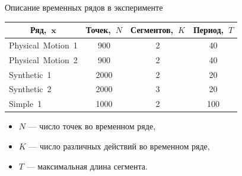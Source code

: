 \documentclass[10pt,pdf,hyperref={unicode}]{beamer}
\begin{document}
\begin{frame}{Описание временных рядов в эксперименте}

\begin{tabular}{|c|c|c|c|}
\hline
	Ряд,~$\textbf{x}$&Точек,~$N$&Сегментов,~$K$&Период,~$T$\\
	\hline
	\multicolumn{1}{|l|}{Physical~Motion~1}
	& 900& 2& 40\\
	\hline
	\multicolumn{1}{|l|}{Physical~Motion~2}
	& 900& 2& 40\\
	\hline
	\multicolumn{1}{|l|}{Synthetic~1}
	& 2000& 2& 20\\
	\hline
	\multicolumn{1}{|l|}{Synthetic~2}
	& 2000& 3& 20\\
	\hline
	\multicolumn{1}{|l|}{Simple~1}
	& 1000& 2& 100\\
\hline

\end{tabular}

\begin{itemize}
	\item $N$ --- число точек во временном ряде,
	\item $K$ --- число различных действий во временном ряде,
	\item $T$ --- максимальная длина сегмента.
\end{itemize}

\end{frame}
\end{document}
